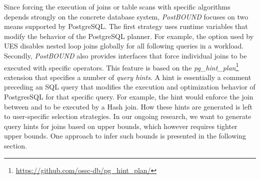 Since forcing the execution of joins or table scans with specific algorithms depends strongly on the concrete database system, \emph{PostBOUND} focuses on two means supported by PostgreSQL. 
The first strategy uses runtime variables that modify the behavior of the PostgreSQL planner. 
For example, the \mbox{} option used by UES disables nested loop joins globally for all following queries in a workload. 
Secondly, \emph{PostBOUND} also provides interfaces that force individual joins to be executed with specific operators. 
This feature is based on the \emph{pg\_hint\_plan}\footnote{\url{https://github.com/ossc-db/pg_hint_plan/}} extension that specifies a number of \emph{query hints}. 
A hint is essentially a comment preceding an SQL query that modifies the execution and optimization behavior of PostgresSQL for that specific query. 
For example, the hint  would enforce the join between  and  to be executed by a Hash join. 
How these hints are generated is left to user-specific selection strategies. 
In our ongoing research, we want to generate query hints for joins based on upper bounds, which however requires tighter upper bounds. One approach to infer such bounds is presented in the following section.


